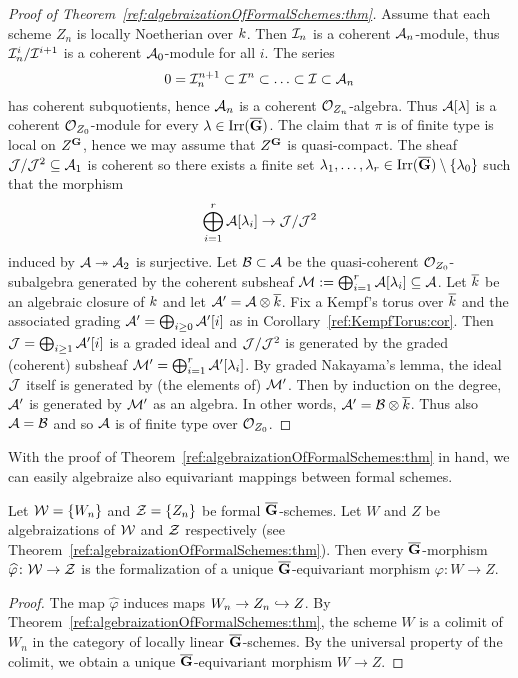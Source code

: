 \begin{proof}[Proof of Theorem~\ref{ref:algebraizationOfFormalSchemes:thm}]
Assume that each scheme $Z_n$ is locally Noetherian over $k$. Then ${\mathcal I}_n$
is a coherent ${\mathcal A}_n$-module, thus ${\mathcal I}_n^i/{\mathcal I}^{i+1}$ is a coherent
${\mathcal A}_0$-module for all $i$. The series
\[
    0 = {\mathcal I}_n^{n+1} \subset {\mathcal I}^n \subset  \ldots \subset {\mathcal I} \subset {\mathcal A}_n
\]
has coherent subquotients, hence ${\mathcal A}_n$ is a coherent ${\mathcal O}_{Z_n}$-algebra.
Thus ${\mathcal A}[\lambda]$ is a coherent ${\mathcal O}_{Z_0}$-module for every
$\lambda\in \operatorname{Irr}(\overline{\mathbf{G}})$. The claim that $\pi$ is of finite type is local on
$Z^{\mathbf{G}}$, hence we may
assume that $Z^{\mathbf{G}}$ is quasi-compact.
The sheaf ${\mathcal J}/{\mathcal J}^2\subseteq {\mathcal A}_1$ is coherent so there exists a finite set
$\lambda_1, \ldots, \lambda_r\in \operatorname{Irr}(\overline{\mathbf{G}})\setminus \{\lambda_0\}$ such that the morphism
\[
    \bigoplus_{i=1}^r{\mathcal A}[\lambda_i]\rightarrow {\mathcal J}/{\mathcal J}^2
\]
induced by ${\mathcal A}\twoheadrightarrow {\mathcal A}_2$ is surjective. Let ${\mathcal B} \subset {\mathcal A}$
be the quasi-coherent ${\mathcal O}_{Z_0}$-subalgebra generated by the coherent
subsheaf ${\mathcal M} := \bigoplus_{i=1}^r{\mathcal A}[\lambda_i]\subseteq {\mathcal A}$.
Let $\overline{k}$ be an algebraic closure of $k$ and let ${\mathcal A}' = {\mathcal A} \otimes
\overline{k}$. Fix a Kempf's torus over
$\overline{k}$ and the associated grading ${\mathcal A}' = \bigoplus_{i\geq 0}
{\mathcal A}'[i]$ as in
Corollary~\ref{ref:KempfTorus:cor}.
Then ${\mathcal J} = \bigoplus_{i\geq 1} {\mathcal A}'[i]$ is a graded ideal and ${\mathcal J}/{\mathcal J}^2$ is
generated by the graded (coherent) subsheaf ${\mathcal M}' = \bigoplus_{i=1}^r{\mathcal A}'[\lambda_i]$. By
graded Nakayama's lemma, the ideal ${\mathcal J}$ itself is generated by (the elements
of) ${\mathcal M}'$. Then by induction on the degree, ${\mathcal A}'$ is generated by ${\mathcal M}'$ as
an algebra. In other words, ${\mathcal A}' = {\mathcal B}\otimes \overline{k}$. Thus also ${\mathcal A} = {\mathcal B}$ and so ${\mathcal A}$ is of
finite type over ${\mathcal O}_{Z_0}$.
\end{proof}

\newcommand{\varphihat}{\widehat{\varphi}}%
With the proof of Theorem~\ref{ref:algebraizationOfFormalSchemes:thm} in hand,
we can easily algebraize also equivariant mappings between formal schemes.

\begin{proposition}\label{ref:algebraizationOfMaps:prop}
    Let ${\mathcal W} = \{W_n\}$ and ${\mathcal Z} = \{Z_n\}$ be formal $\overline{\mathbf{G}}$-schemes. Let $W$ and $Z$ be
    algebraizations of ${\mathcal W}$ and ${\mathcal Z}$ respectively (see
    Theorem~\ref{ref:algebraizationOfFormalSchemes:thm}). Then every
    $\overline{\mathbf{G}}$-morphism $\varphihat\colon\Wformal\to \Zformal$  is the formalization of a unique
    $\overline{\mathbf{G}}$-equivariant morphism $\varphi\colon W\to Z$.
\end{proposition}
\begin{proof}
    The map $\varphihat$ induces maps $W_n \to Z_n \hookrightarrow Z$. By
    Theorem~\ref{ref:algebraizationOfFormalSchemes:thm}, the scheme $W$ is a
    colimit of $W_n$ in the category of locally linear $\overline{\mathbf{G}}$-schemes. By the universal
    property of the colimit, we obtain a unique $\overline{\mathbf{G}}$-equivariant morphism $W\to Z$.
\end{proof}

